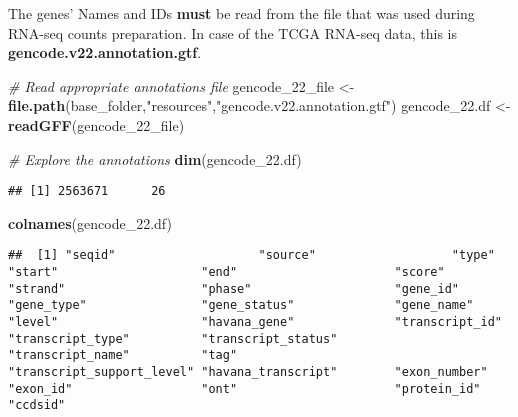 \documentclass[]{book}
\newenvironment{Shaded}{\begin{snugshade}}{\end{snugshade}}
\newcommand{\KeywordTok}[1]{\textcolor[rgb]{0.13,0.29,0.53}{\textbf{#1}}}
\newcommand{\FloatTok}[1]{\textcolor[rgb]{0.00,0.00,0.81}{#1}}
\newcommand{\StringTok}[1]{\textcolor[rgb]{0.31,0.60,0.02}{#1}}
\newcommand{\CommentTok}[1]{\textcolor[rgb]{0.56,0.35,0.01}{\textit{#1}}}
\newcommand{\OperatorTok}[1]{\textcolor[rgb]{0.81,0.36,0.00}{\textbf{#1}}}
\newcommand{\NormalTok}[1]{#1}
\begin{document}
The genes' Names and IDs \textbf{must} be read from the file that was
used during RNA-seq counts preparation. In case of the TCGA RNA-seq
data, this is \textbf{gencode.v22.annotation.gtf}.

\begin{Shaded}
\begin{Highlighting}[]
\CommentTok{# Read appropriate annotations file}
\NormalTok{gencode_22_file <-}\StringTok{ }\KeywordTok{file.path}\NormalTok{(base_folder,}\StringTok{"resources"}\NormalTok{,}\StringTok{"gencode.v22.annotation.gtf"}\NormalTok{)}
\NormalTok{gencode_}\FloatTok{22.}\NormalTok{df <-}\StringTok{ }\KeywordTok{readGFF}\NormalTok{(gencode_22_file)}

\CommentTok{# Explore the annotations}
\KeywordTok{dim}\NormalTok{(gencode_}\FloatTok{22.}\NormalTok{df)}
\end{Highlighting}
\end{Shaded}

\begin{verbatim}
## [1] 2563671      26
\end{verbatim}

\begin{Shaded}
\begin{Highlighting}[]
\KeywordTok{colnames}\NormalTok{(gencode_}\FloatTok{22.}\NormalTok{df)}
\end{Highlighting}
\end{Shaded}

\begin{verbatim}
##  [1] "seqid"                    "source"                   "type"                     "start"                    "end"                      "score"                    "strand"                   "phase"                    "gene_id"                  "gene_type"                "gene_status"              "gene_name"                "level"                    "havana_gene"              "transcript_id"            "transcript_type"          "transcript_status"        "transcript_name"          "tag"                      "transcript_support_level" "havana_transcript"        "exon_number"              "exon_id"                  "ont"                      "protein_id"               "ccdsid"
\end{verbatim}

\begin{Shaded}
\end{Shaded}
\end{document}
